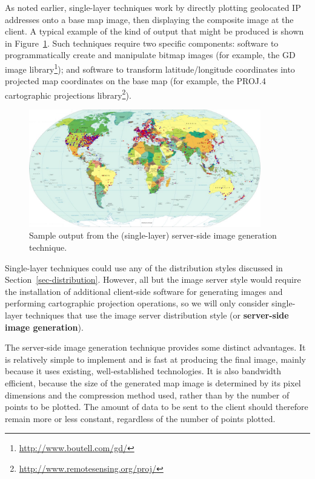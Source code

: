 \documentclass[acmnow]{acmtrans2m}
\begin{document}
As noted earlier, single-layer techniques work by directly plotting
geolocated IP addresses onto a base map image, then displaying the
composite image at the client. A typical example of the kind of output
that might be produced is shown in Figure~\ref{fig-image}. Such
techniques require two specific components: software to programmatically
create and manipulate bitmap images (for example, the GD image
library\footnote{\url{http://www.boutell.com/gd/}}); and software to
transform latitude/longitude coordinates into projected map coordinates
on the base map (for example, the PROJ.4 cartographic projections
library\footnote{\url{http://www.remotesensing.org/proj/}}).


\begin{figure}
	\centering
	\includegraphics[width=0.9\textwidth,keepaspectratio]{ImageGeneration-full}
	\caption{Sample output from the (single-layer) server-side image
		generation technique.}
	\label{fig-image}
\end{figure}


Single-layer techniques could use any of the distribution styles
discussed in Section~\ref{sec-distribution}. However, all but the image
server style would require the installation of additional client-side
software for generating images and performing cartographic projection
operations, so we will only consider single-layer techniques that use
the image server distribution style (or \textbf{server-side image
generation}).

The server-side image generation technique provides some distinct
advantages. It is relatively simple to implement and is fast at
producing the final image, mainly because it uses existing,
well-established technologies. It is also bandwidth efficient, because
the size of the generated map image is determined by its pixel
dimensions and the compression method used, rather than by the number of
points to be plotted. The amount of data to be sent to the client should
therefore remain more or less constant, regardless of the number of
points plotted.
\end{document}
